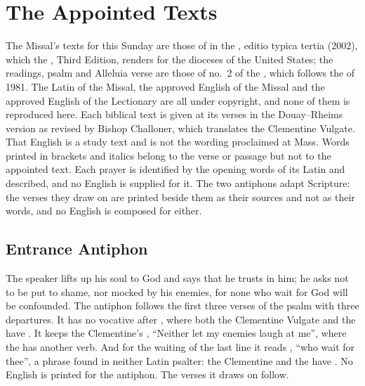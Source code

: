 \section{The Appointed Texts}
\label{sec:appointed-texts}

The Missal's texts for this Sunday are those of  in
the , editio typica tertia (2002), which the
, Third Edition, renders for the dioceses of the United
States; the readings, psalm and Alleluia verse are those of no.~2 of the
, which follows the  of
1981. The Latin of the Missal, the approved English of the Missal and the
approved English of the Lectionary are all under copyright, and none of them
is reproduced here. Each biblical text is given at its verses in the
Douay--Rheims version as revised by Bishop Challoner, which translates the
Clementine Vulgate. That English is a study text and is not the wording
proclaimed at Mass. Words printed in brackets and italics belong to the verse
or passage but not to the appointed text. Each prayer is identified by the
opening words of its Latin and described, and no English is supplied for it.
The two antiphons adapt Scripture: the verses they draw on are printed beside
them as their sources and not as their words, and no English is composed for
either.

\subsection{Entrance Antiphon}
\label{proper-entrance-antiphon}


\noindent The speaker lifts up his soul to God and says that he trusts in him;
he asks not to be put to shame, nor mocked by his enemies, for none who wait
for God will be confounded. The antiphon follows the first three verses of the
psalm with three departures. It has no vocative after , where
both the Clementine Vulgate and the  have .
It keeps the Clementine's , ``Neither
let my enemies laugh at me'', where the  has another verb.
And for the waiting of the last line it reads ,
``who wait for thee'', a phrase found in neither Latin psalter: the Clementine
and the  have . No English is
printed for the antiphon. The verses it draws on follow.


